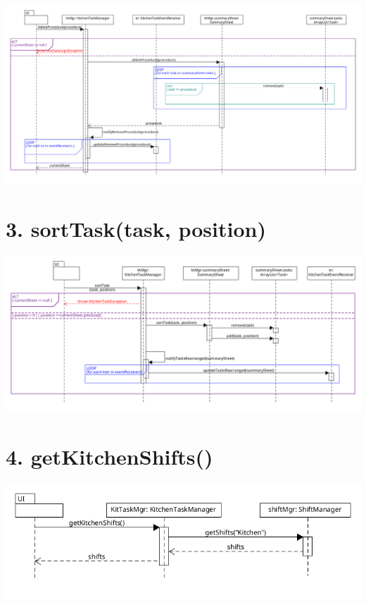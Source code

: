 \begin{center}
  \includegraphics[scale = 0.25]{images/DSD/DSD 2a.png}
\end{center}

\pagebreak

\section*{3. sortTask(task, position)}

\begin{center}
  \includegraphics[scale = 0.35]{images/DSD/DSD 3.png}
\end{center}

\pagebreak

\section*{4. getKitchenShifts()}

\begin{center}
  \includegraphics[scale = 0.5]{images/DSD/DSD 4.png}
\end{center}

